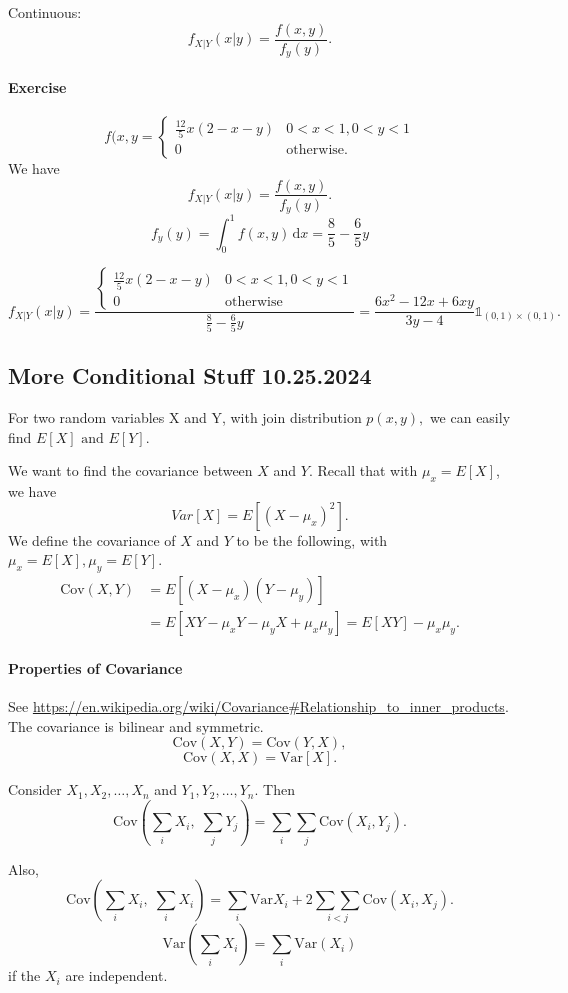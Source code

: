 \documentclass[12pt]{article}
\newcommand{\diffn}[1]{\,\mathrm{d}{#1}}
\begin{document}
Continuous:
\[f_{X|Y}(x|y)=\frac{f(x,y)}{f_y(y)}.\]
\paragraph{Exercise}
\[f(x,y=\begin{cases}\frac{12}{5}x(2-x-y)&0<x<1,0<y<1\\
0&\mathrm{otherwise}.
\end{cases}\]
We have
\[f_{X|Y}(x|y)=\frac{f(x,y)}{f_y(y)}.\]
\[f_y(y)=\int_{0}^1 f(x,y)\diffn{x}=\frac{8}{5}-\frac{6}{5}y\]

\[f_{X|Y}(x|y)=\frac{ \begin{cases}\frac{12}{5}x(2-x-y)&0<x<1,0<y<1\\
0&\mathrm{otherwise}
\end{cases}}{{\frac{8}{5}-\frac{6}{5}y}}=\frac{6x^2-12x+6xy}{3y-4}\mathds{1}_{(0,1)\times(0,1)}.\]

\subsection{More Conditional Stuff 10.25.2024}
For two random variables X and Y, with join distribution $p(x,y),$ we can easily find 
$E[X]\text{ and }E[Y]$.

We want to find the covariance between $X$ and $Y.$ Recall that with $\mu_x = E[X]$, we have
\[Var[X]=E[(X-\mu_x)^2].\]
We define the covariance of $X$ and $Y$ to be the following, with $\mu_x=E[X],\mu_y=E[Y].$
\begin{align*}
\mathrm{Cov}(X,Y)&=E[(X-\mu_x)(Y-\mu_y)] \\
&= E[XY-\mu_xY-\mu_yX+\mu_x\mu_y]=E[XY]-\mu_x\mu_y.
\end{align*}

\paragraph{Properties of Covariance}
See \url{https://en.wikipedia.org/wiki/Covariance#Relationship_to_inner_products}. The covariance is bilinear and symmetric.
\[\mathrm{Cov}(X,Y)=\mathrm{Cov}(Y,X),\]
\[\mathrm{Cov}(X,X)=\mathrm{Var}[X].\]

Consider $X_1,X_2,\dots,X_n$
and
$Y_1,Y_2,\dots,Y_n.$
Then
\[\mathrm{Cov}\left(\sum_i X_i,\;\sum_j Y_j\right)=\sum_i\sum_j\mathrm{Cov}(X_i,Y_j).\]

Also,
\[\mathrm{Cov}\left(\sum_iX_i,\;\sum_iX_i\right)=\sum_i \mathrm{Var}X_i+2\underset{i<j}{\sum\sum}\mathrm{Cov}(X_i,X_j).\]
\[\mathrm{Var}\left(\sum_iX_i\right)=\sum_i\mathrm{Var}(X_i)\]
if the $X_i$ are independent.
\end{document}
